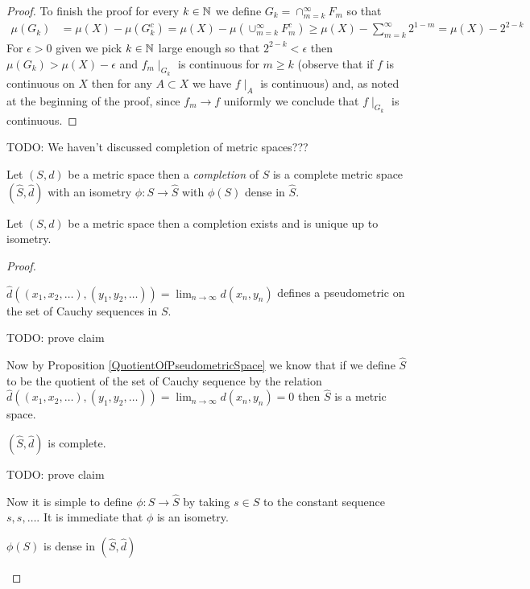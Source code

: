 \begin{proof}
To finish the proof for every $k \in \mathbb{N}$ we define $G_k = \cap_{m=k}^\infty F_m$ so that 
\begin{align*}
\mu(G_k) &= \mu(X) - \mu(G_k^c) = \mu(X) - \mu\left( \cup_{m=k}^\infty F^c_m \right) \geq \mu(X) - \sum_{m=k}^\infty 2^{1-m} = \mu(X) - 2^{2 - k}
\end{align*}
For $\epsilon > 0$ given we pick $k \in \mathbb{N}$ large enough so that $2^{2-k} < \epsilon$ then $\mu(G_k) > \mu(X) - \epsilon$ and $f_m\mid_{G_k}$ is continuous for $m \geq k$  (observe that if $f$ is continuous on $X$ then for any $A \subset X$ we have $f\mid_A$ is continuous) and, as noted at the beginning of the proof, since $f_m \to f$ uniformly we conclude that $f \mid_{G_k}$ is continuous. 
\end{proof}

TODO: We haven't discussed completion of metric spaces???

\begin{defn}Let $(S,d)$ be a metric space then a \emph{completion} of $S$ is a complete metric space $(\hat{S}, \hat{d})$ with an isometry $\phi : S \to \hat{S}$ with $\phi(S)$ dense in $\hat{S}$.
\end{defn}

\begin{thm}\label{CompletionOfMetricSpace}Let $(S,d)$ be a metric space then a completion exists and is unique up to isometry.
\end{thm}
\begin{proof}

\begin{clm} $\hat{d}((x_1, x_2, \dotsc), (y_1, y_2, \dotsc)) = \lim_{n \to \infty} d(x_n, y_n)$ defines a pseudometric on the set of Cauchy sequences in $S$.
\end{clm}
TODO: prove claim

Now by Proposition \ref{QuotientOfPseudometricSpace} we know that if we define $\hat{S}$ to be the quotient of the set of Cauchy sequence by the relation $\hat{d}((x_1, x_2, \dotsc), (y_1, y_2, \dotsc)) = \lim_{n \to \infty} d(x_n,y_n) = 0$ then $\hat{S}$ is a metric space.

\begin{clm}$(\hat{S}, \hat{d})$ is complete.
\end{clm}
TODO: prove claim

Now it is simple to define $\phi : S \to \hat{S}$ by taking $s \in S$ to the constant sequence $s,s, \dotsc$.  It is immediate that $\phi$ is an isometry.
\begin{clm} $\phi(S)$ is dense in $(\hat{S}, \hat{d})$
\end{clm}
\end{proof}

